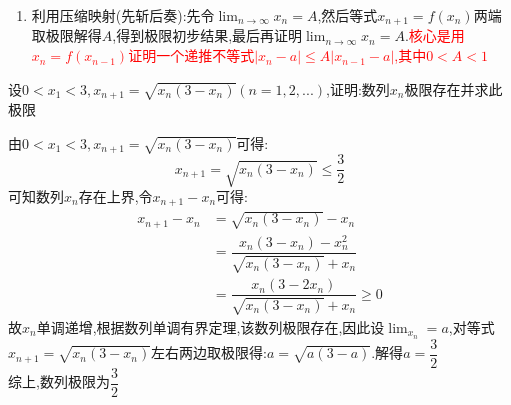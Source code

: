 \documentclass[8pt a4paper, oneside, UTF8]{ctexbook}
\begin{document}
\begin{sloppypar}
\begin{enumerate}
\begin{enumerate}
\begin{itemize}
\begin{proof}
\begin{center}
                        \end{center}
                    \end{proof}
                \end{itemize}
            \end{enumerate}
        \item 利用压缩映射(先斩后奏):先令$\lim_{n\to\infty} x_n=A$,然后等式$x_{n+1}=f(x_n)$两端取极限解得$A$,得到极限初步结果,最后再证明$\lim_{n\to\infty} x_n=A$.\textcolor{red}{核心是用$x_n=f(x_{n-1})$证明一个递推不等式$|x_n-a| \leqslant A|x_{n-1}-a|$,其中$0<A<1$}
    \end{enumerate}
    \begin{problem}
        设$0<x_1<3,x_{n+1}=\sqrt{x_n\left(3-x_n\right)}\left(n=1,2,...\right)$,证明:数列$x_n$极限存在并求此极限
    \end{problem}
    \begin{solution}
        由$0<x_1<3,x_{n+1}=\sqrt{x_n(3-x_n)}$可得:
        $$
            x_{n+1}=\sqrt{x_n(3-x_n)}\leqslant \dfrac{3}{2}
        $$
        可知数列$x_n$存在上界,令$x_{n+1}-x_n$可得:
        \begin{align*}
            x_{n+1}-x_n & = \sqrt{x_n(3-x_n)}-x_n \\
          & = \dfrac{x_n(3-x_n)-x_n^2}{\sqrt{x_n(3-x_n)}+x_n}\\ 
          & = \dfrac{x_n(3-2x_n)}{\sqrt{x_n(3-x_n)}+x_n}\geqslant0
        \end{align*}
        故$x_n$单调递增,根据数列单调有界定理,该数列极限存在,因此设$\lim_{x_n}=a$,对等式$x_{n+1}=\sqrt{x_n(3-x_n)}$左右两边取极限得:$a=\sqrt{a(3-a)}$.解得$a=\dfrac{3}{2}$\\综上,数列极限为$\dfrac{3}{2}$
    \end{solution}
    \begin{note}

\end{note}
\end{sloppypar}
\end{document}
